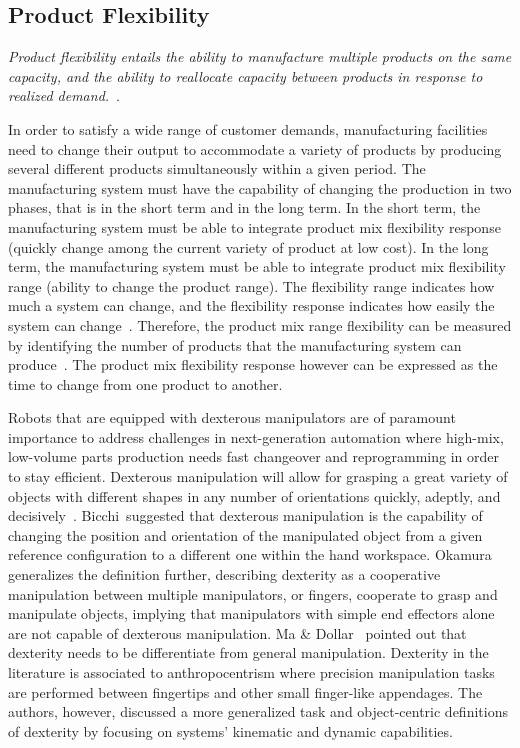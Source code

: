 \subsection{Product Flexibility}
\emph{Product flexibility entails the ability to manufacture multiple products on the same capacity, and the ability to reallocate capacity between products in response to realized demand.}~\cite{Goyal.2011}.

In order to satisfy a wide range of customer demands, manufacturing facilities need to
change their output to accommodate a variety of products by producing several different products
simultaneously within a given period. The manufacturing system must have the capability of changing the production in two phases, that is in the short term and in the long term. In the short term, the manufacturing system must be able to integrate product mix flexibility response (quickly change among the current variety of product at low cost). In the long term, the manufacturing system must be able to integrate product mix flexibility range (ability to change the product range). The flexibility range indicates how much a system can change, and the flexibility response indicates how easily the system can change~\cite{Slack.1980}. Therefore, the product mix
range flexibility can be measured by identifying the number of products that the manufacturing system can produce~\cite{BROWNE.1984,Muramatsu.1985,Sethi.1990}. The product mix flexibility response however can be expressed as the time to change from one product
to another.


Robots that are equipped with dexterous manipulators are of paramount importance to address challenges in next-generation automation where high-mix, low-volume parts production needs fast changeover and reprogramming in order to stay efficient. Dexterous manipulation will allow for grasping a great variety of objects with different shapes in any number of orientations quickly, adeptly, and decisively~\cite{Falco.NISTIR.2013}. Bicchi~\cite{Bicchi.2000}suggested that dexterous manipulation is the capability of changing the position and orientation of the manipulated object from a given reference configuration to a different one within the hand workspace. Okamura\etal\cite{Okamura.2000}  generalizes the definition further, describing dexterity as a cooperative
manipulation between multiple manipulators, or fingers, cooperate to grasp and manipulate objects, implying that manipulators with simple end effectors alone are not capable of dexterous manipulation. Ma \& Dollar~\cite{MA.2011} pointed out that dexterity needs to be differentiate from general manipulation. Dexterity in the literature is associated to anthropocentrism where precision manipulation tasks are performed between fingertips and other small finger-like appendages. The authors, however, discussed a more generalized task and object-centric definitions of dexterity by focusing on systems' kinematic and dynamic capabilities.

